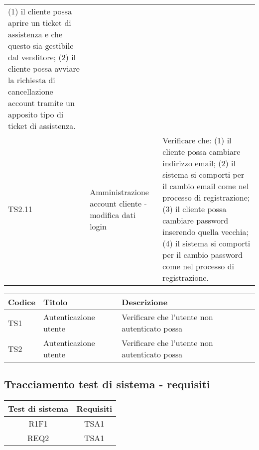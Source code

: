 \begin{center}
\begin{longtable}{|p{1cm}|p{6.85cm}|p{7cm}|}
													(1) il cliente possa aprire un ticket di assistenza e che questo sia gestibile dal venditore;
													(2) il cliente possa avviare la richiesta di cancellazione account tramite un apposito tipo di ticket di assistenza. \\
	TS2.11 & Amministrazione account cliente - modifica dati login & Verificare che:
													(1) il cliente possa cambiare indirizzo email;
													(2) il sistema si comporti per il cambio email come nel processo di registrazione;
													(3) il cliente possa cambiare password inserendo quella vecchia;
													(4) il sistema si comporti per il cambio password come nel processo di registrazione. \\
	\hline

	\end{longtable}
\end{center}

\begin{center}
	\begin{longtable}{|p{1cm}|p{6.85cm}|p{7cm}|}
	\hline
	\rowcolor{lighter-grayer}
	\textbf{Codice} & \textbf{Titolo} & \textbf{Descrizione} \\
	\hline
	\endfirsthead



	\hline
	TS1 & Autenticazione utente & Verificare che l'utente non autenticato possa  \\
	TS2 & Autenticazione utente & Verificare che l'utente non autenticato possa  \\

	\hline

	\end{longtable}
\end{center}


\subsection{Tracciamento test di sistema - requisiti}

\begin{center}
	\begin{longtable}{|c|c|}
	\hline
	\rowcolor{lighter-grayer}
	\textbf{Test di sistema} & \textbf{Requisiti} \\
	\hline
	\endfirsthead


	
	\hline
	R1F1 & TSA1  \\
	REQ2 & TSA1 \\

	\hline

	\end{longtable}
\end{center}

